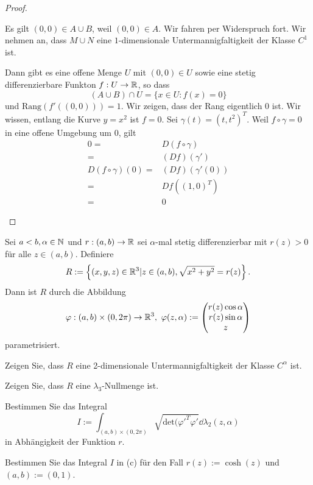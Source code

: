 \begin{proof}
\begin{parts}
	Es gilt $(0,0)\in A\cup B$, weil $(0,0)\in A$. Wir fahren per Widerspruch fort. Wir nehmen an, dass $M\cup N$ eine $1$-dimensionale Untermannigfaltigkeit der Klasse $C^1$ ist. 

	Dann gibt es eine offene Menge $U$ mit $(0,0)\in U$ sowie eine stetig differenzierbare Funkton $f:U\to \mathbb{R}$, so dass
	 \[
		 (A\cup B)\cap U=\{x\in U: f(x)=0\} 
	\] 
	und $\text{Rang}(f'((0,0)))=1$. Wir zeigen, dass der Rang eigentlich $0$ ist. Wir wissen, entlang die Kurve $y=x^2$ ist $f=0$. Sei $\gamma(t)= (t,t^2)^T$. Weil $f\circ \gamma=0$ in eine offene Umgebung um $0$, gilt
	\begin{align*}
		0=&D(f\circ \gamma)\\
		=&(Df)(\gamma')\\
		D(f\circ \gamma)(0)=&(Df)(\gamma'(0))\\
		=&Df((1,0)^T)\\
		=&0
	\end{align*}
	\end{parts}
\end{proof}
\begin{Problem}
	Sei $a<b,\alpha\in \mathbb{N}$ und $r:(a,b)\to \mathbb{R}$ sei $\alpha$-mal stetig differenzierbar mit $r(z)>0$ f\"{u}r alle $z\in (a,b)$. Definiere
	\[
	R:=\left\{ (x,y,z)\in \mathbb{R}^3|z\in (a,b), \sqrt{x^2+y^2} =r(z) \right\} 
	.\] 
	Dann ist $R$ durch die Abbildung
	\[
	\varphi:(a,b)\times (0,2\pi)\to \mathbb{R}^3,~\varphi(z,\alpha):=\begin{pmatrix} r(z)\cos\alpha \\ r(z)\sin\alpha \\ z \end{pmatrix} 
\]
parametrisiert.
\begin{parts}
\item Zeigen Sie, dass $R$ eine 2-dimensionale Untermannigfaltigkeit der Klasse $C^\alpha$ ist.
\item Zeigen Sie, dass $R$ eine $\lambda_3$-Nullmenge ist.
\item Bestimmen Sie das Integral
	\[
		I:=\int_{(a,b)\times (0,2\pi)} \sqrt{\text{det}(\varphi'^T\varphi'} \dd{\lambda_2(z,\alpha)}
	\]
	in Abhängigkeit der Funktion $r$.
\item Bestimmen Sie das Integral $I$ in (c) f\"{u}r den Fall $r(z):=\cosh(z)$ und $(a,b):=(0,1)$.
\end{parts}
\end{Problem}
